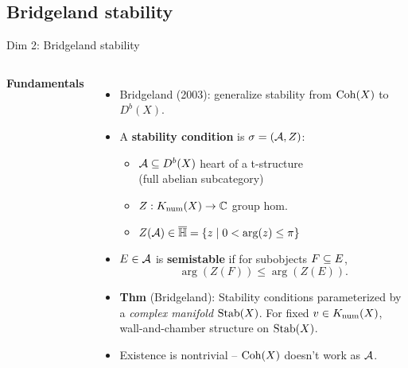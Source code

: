 \documentclass[8pt]{beamer} %
\begin{document}
\subsection{Bridgeland stability}
\begin{frame}{Dim 2: Bridgeland stability}
    \begin{columns}[t]
        \textbf{Fundamentals}
        \begin{itemize}
            \item<2-> Bridgeland (2003): generalize stability from $\mathrm{Coh}(X)$ to $D^b(X)$.
            \item<3-> A \textbf{stability condition} is $\sigma = (\mathcal{A}, Z)$:
            \begin{itemize}
                \item<4-> $\mathcal{A} \subseteq D^b(X)$ heart of a t-structure \\
                \qquad\qquad (full abelian subcategory)
                \item<5-> $Z: K_{\mathrm{num}}(X) \to \mathbb{C}$ group hom.
                \item<6-> $Z(\mathcal{A}) \in \overline{\mathbb{H}} = \{ z \;|\; 0 < \arg(z) \le \pi \}$
            \end{itemize}
            \item<7-> $E \in \mathcal{A}$ is \textbf{semistable} if for subobjects $F \subseteq E$,
            \[ \arg(Z(F)) \le \arg(Z(E)). \]
            \item<8-> \textbf{Thm} (Bridgeland): Stability conditions parameterized by a \textit{complex manifold} $\operatorname{\mathrm{Stab}}(X)$. For fixed $v \in K_{\mathrm{num}}(X)$, wall-and-chamber structure on $\operatorname{\mathrm{Stab}}(X)$.
            \item<9-> Existence is nontrivial -- $\mathrm{Coh}(X)$ doesn't work as $\mathcal{A}$.
        \end{itemize}
        

\end{columns}
\end{frame}
\end{document}
